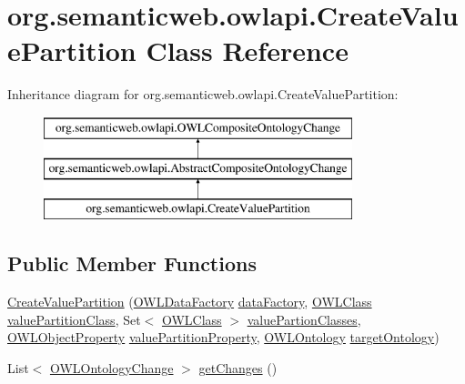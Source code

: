 \hypertarget{classorg_1_1semanticweb_1_1owlapi_1_1_create_value_partition}{\section{org.\-semanticweb.\-owlapi.\-Create\-Value\-Partition Class Reference}
\label{classorg_1_1semanticweb_1_1owlapi_1_1_create_value_partition}
}
Inheritance diagram for org.\-semanticweb.\-owlapi.\-Create\-Value\-Partition\-:\begin{figure}[H]
\begin{center}
\leavevmode
\includegraphics[height=3.000000cm]{classorg_1_1semanticweb_1_1owlapi_1_1_create_value_partition}
\end{center}
\end{figure}
\subsection*{Public Member Functions}
\begin{DoxyCompactItemize}
\item 
\hyperlink{classorg_1_1semanticweb_1_1owlapi_1_1_create_value_partition_ad2d4f92469ea1c479f2b6a0cf4e9e36a}{Create\-Value\-Partition} (\hyperlink{interfaceorg_1_1semanticweb_1_1owlapi_1_1model_1_1_o_w_l_data_factory}{O\-W\-L\-Data\-Factory} \hyperlink{classorg_1_1semanticweb_1_1owlapi_1_1_abstract_composite_ontology_change_aebcfd0601543ebb5f72b1fe53a5352c9}{data\-Factory}, \hyperlink{interfaceorg_1_1semanticweb_1_1owlapi_1_1model_1_1_o_w_l_class}{O\-W\-L\-Class} \hyperlink{classorg_1_1semanticweb_1_1owlapi_1_1_create_value_partition_ad0545108ace014a623992232fafee5b7}{value\-Partition\-Class}, Set$<$ \hyperlink{interfaceorg_1_1semanticweb_1_1owlapi_1_1model_1_1_o_w_l_class}{O\-W\-L\-Class} $>$ \hyperlink{classorg_1_1semanticweb_1_1owlapi_1_1_create_value_partition_ad93b5480402729ec84a6a4cc96bd3792}{value\-Partion\-Classes}, \hyperlink{interfaceorg_1_1semanticweb_1_1owlapi_1_1model_1_1_o_w_l_object_property}{O\-W\-L\-Object\-Property} \hyperlink{classorg_1_1semanticweb_1_1owlapi_1_1_create_value_partition_ac88312b96c91192a43e20b2b78df3860}{value\-Partition\-Property}, \hyperlink{interfaceorg_1_1semanticweb_1_1owlapi_1_1model_1_1_o_w_l_ontology}{O\-W\-L\-Ontology} \hyperlink{classorg_1_1semanticweb_1_1owlapi_1_1_create_value_partition_a51fe93de1be6192dd7a7efcb409a8d8c}{target\-Ontology})
\item 
List$<$ \hyperlink{classorg_1_1semanticweb_1_1owlapi_1_1model_1_1_o_w_l_ontology_change}{O\-W\-L\-Ontology\-Change} $>$ \hyperlink{classorg_1_1semanticweb_1_1owlapi_1_1_create_value_partition_a24ca66232bcb652688f8e438e74718f2}{get\-Changes} ()
\end{DoxyCompactItemize}
